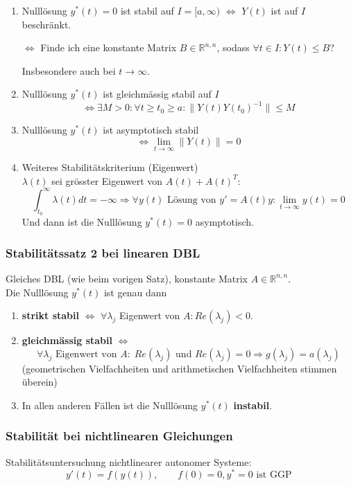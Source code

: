 \documentclass[a4paper]{article}
\newcommand{\R}{\mathbb{R}}
\begin{document}
\begin{enumerate}
	\item Nulllösung $y ^{*} (t) = 0$ ist stabil auf $I=[a, \infty)$
		$\Leftrightarrow$ $Y(t)$ ist auf $I$ beschränkt.
		
		$\Leftrightarrow$ Finde ich eine konstante Matrix $B \in \R ^{n,n}$,
		sodass $\forall t \in I: Y(t) \leq B$?

		Insbesondere auch bei $t \to \infty$.
	\item Nulllösung $y ^{*} (t)$ ist gleichmässig stabil auf $I$
		\[
		\Leftrightarrow \exists M > 0: \forall t \geq t_0 \geq a:
		\| Y(t) Y (t_0) ^{-1} \| \leq M
		\] 
	\item Nulllösung $y ^{*} (t)$ ist asymptotisch stabil
		\[
		\Leftrightarrow \lim_{t \to \infty} 
		\| Y(t) \| = 0
		\]
	\item Weiteres Stabilitätskriterium (Eigenwert)
		\\

		$\lambda (t)$ sei grösster Eigenwert von $A(t) + A(t) ^{T}$:
		\[
			\int_{t_0}^{\infty} \lambda (t) dt = - \infty 
			\Rightarrow \forall y(t) \text{ Lösung von }
			y' = A(t) y :
			\lim_{t \to \infty} y(t) = 0
		\] 
		Und dann ist die Nulllösung $y ^{*} (t) = 0$
		asymptotisch.
\end{enumerate}

\subsubsection{Stabilitätssatz 2 bei linearen DBL}
Gleiches DBL (wie beim vorigen Satz), konstante Matrix $A \in \R ^{n,n}$.
\\

Die Nulllösung $y ^{*} (t)$ ist genau dann
\begin{enumerate}
	\item \textbf{strikt stabil} $\Leftrightarrow$
		$\forall \lambda_j $ Eigenwert von $A: Re(\lambda_j) < 0$.
	\item \textbf{gleichmässig stabil} $\Leftrightarrow$
		\[
			\forall \lambda_j
			\text{ Eigenwert von }A : \;
			Re (\lambda_j)
			\text{ und }
			Re (\lambda_j) = 0
			\Rightarrow g( \lambda_j ) = a( \lambda_j )
		\] 
		(geometrischen Vielfachheiten und arithmetischen Vielfachheiten
		stimmen überein)
	\item In allen anderen Fällen ist die Nulllösung 
		$y ^{*} (t)$ \textbf{instabil}.
\end{enumerate}

\subsubsection{Stabilität bei nichtlinearen Gleichungen}
Stabilitätsuntersuchung nichtlinearer autonomer Systeme:
\[
	y' (t) = f(y(t)), \qquad 
	f(0) = 0, y ^{*} = 0
	\text{ ist GGP }
\] 
\end{document}
